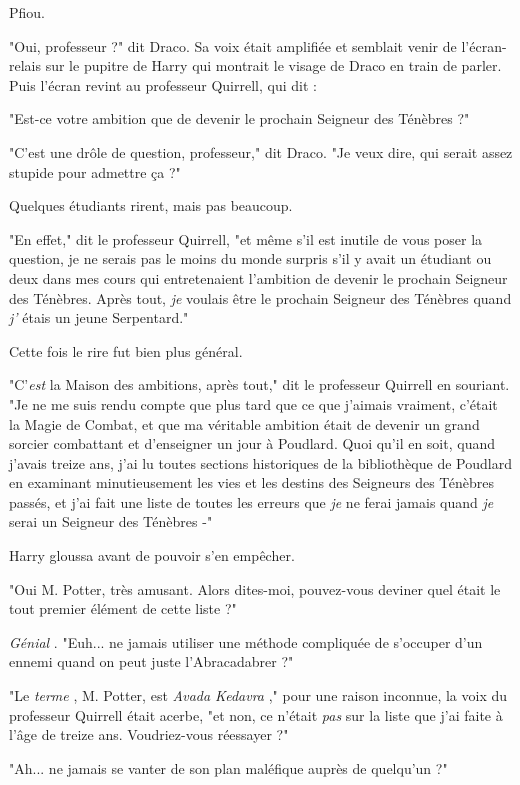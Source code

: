 Pfiou.

"Oui, professeur ?" dit Draco. Sa voix était amplifiée et semblait venir de l'écran-relais sur le pupitre de Harry qui montrait le visage de Draco en train de parler. Puis l'écran revint au professeur Quirrell, qui dit :

"Est-ce votre ambition que de devenir le prochain Seigneur des Ténèbres ?"

"C'est une drôle de question, professeur," dit Draco. "Je veux dire, qui serait assez stupide pour admettre ça ?"

Quelques étudiants rirent, mais pas beaucoup.

"En effet," dit le professeur Quirrell, "et même s'il est inutile de vous poser la question, je ne serais pas le moins du monde surpris s'il y avait un étudiant ou deux dans mes cours qui entretenaient l'ambition de devenir le prochain Seigneur des Ténèbres. Après tout, \emph{je}  voulais être le prochain Seigneur des Ténèbres quand \emph{j'} étais un jeune Serpentard."

Cette fois le rire fut bien plus général.

"C'\emph{est}  la Maison des ambitions, après tout," dit le professeur Quirrell en souriant. "Je ne me suis rendu compte que plus tard que ce que j'aimais vraiment, c'était la Magie de Combat, et que ma véritable ambition était de devenir un grand sorcier combattant et d'enseigner un jour à Poudlard. Quoi qu'il en soit, quand j'avais treize ans, j'ai lu toutes sections historiques de la bibliothèque de Poudlard en examinant minutieusement les vies et les destins des Seigneurs des Ténèbres passés, et j'ai fait une liste de toutes les erreurs que \emph{je}  ne ferai jamais quand \emph{je}  serai un Seigneur des Ténèbres -"

Harry gloussa avant de pouvoir s'en empêcher.

"Oui M. Potter, très amusant. Alors dites-moi, pouvez-vous deviner quel était le tout premier élément de cette liste ?"

\emph{Génial} . "Euh... ne jamais utiliser une méthode compliquée de s'occuper d'un ennemi quand on peut juste l'Abracadabrer ?"

"Le \emph{terme} , M. Potter, est \emph{Avada Kedavra} ," pour une raison inconnue, la voix du professeur Quirrell était acerbe, "et non, ce n'était \emph{pas}  sur la liste que j'ai faite à l'âge de treize ans. Voudriez-vous réessayer ?"

"Ah... ne jamais se vanter de son plan maléfique auprès de quelqu'un ?"


